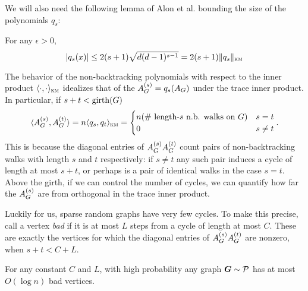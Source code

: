 
We will also need the following lemma of Alon et al. \cite[Lemma 2.3]{alon2007non} bounding the size of the polynomials $q_s$:
\begin{lemma}   \label{lem:NBW-poly-bound}
    For any $\epsilon>0$,
    $$
        |q_s(x)| \le 2(s+1)\sqrt{d(d-1)^{s-1}} = 2(s+1)\|q_s\|_{\textsc{km}}
    $$
\end{lemma}

The behavior of the non-backtracking polynomials with respect to the inner product $\langle \cdot,\cdot \rangle_{\textsc{km}}$ idealizes that of the $A^{(s)}_{G} = q_s(A_{G})$ under the trace inner product. In particular, if $s + t < \operatorname{girth}(G)$
$$
    \langle A^{(s)}_{G},A^{(t)}_{G} \rangle = n\langle q_s,q_t \rangle_{\textsc{km}} = \begin{cases} n (\text{\# length-$s$ n.b. walks on $G$}) & s=t \\ 0 & s \neq t \end{cases}.
$$
This is because the diagonal entries of $A^{(s)}_{G}A^{(t)}_{G}$ count pairs of non-backtracking walks with length $s$ and $t$ respectively: if $s\neq t$ any such pair induces a cycle of length at most $s+t$, or perhaps is a pair of identical walks in the case $s=t$. Above the girth, if we can control the number of cycles, we can quantify how far the $A^{(s)}_{G}$ are from orthogonal in the trace inner product.

Luckily for us, sparse random graphs have very few cycles. To make this precise, call a vertex \emph{bad} if it is at most $L$ steps from a cycle of length at most $C$. These are exactly the vertices for which the diagonal entries of $A^{(s)}_{G}A^{(t)}_{G}$ are nonzero, when $s+t < C+L$.

\begin{lemma}
    For any constant $C$ and $L$, with high probability any graph $\boldsymbol{G} \sim \mathcal{P}$ has at most $O(\log n)$ bad vertices.
\end{lemma}

